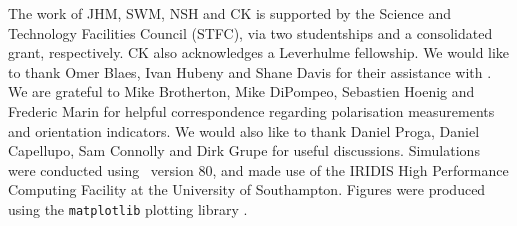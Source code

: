 \documentclass[useAMS,usenatbib]{mn2e_x}
\begin{document}
The work of JHM, SWM, NSH and CK is supported by the
Science and Technology Facilities Council (STFC),
via two studentships and a consolidated grant, respectively.
CK also acknowledges a Leverhulme fellowship.
We would like to thank Omer Blaes, Ivan Hubeny and Shane Davis for their
assistance with \agn. We are grateful to Mike Brotherton, Mike DiPompeo,
Sebastien Hoenig and Frederic Marin for helpful correspondence regarding
polarisation measurements and orientation indicators.
We would also like to thank Daniel Proga, Daniel Capellupo, Sam Connolly and
Dirk Grupe for useful discussions.  Simulations were conducted using \py\ version 80,
and made use of the IRIDIS High Performance Computing Facility at the
University of Southampton. Figures were produced using the {\tt matplotlib} plotting library
\citep{matplotlib}.




\clearpage
\clearpage
\end{document}
